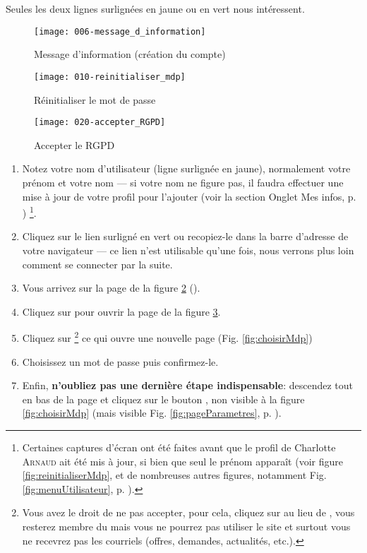 Seules les deux lignes surlignées en jaune ou en vert nous intéressent.
\begin{figure}
    \texttt{[image: 006-message\_d\_information]}
    \caption{Message d'information (création du compte)}
    \label{fig:messageInformation}
\end{figure}
\begin{figure}
    \texttt{[image: 010-reinitialiser\_mdp]}
    \caption{Réinitialiser le mot de passe}
    \label{fig:reinitialiserMdp}
\end{figure}
\begin{figure}
    \texttt{[image: 020-accepter\_RGPD]}
    \caption{Accepter le RGPD}
    \label{fig:accepterRgpd}
\end{figure}
\begin{enumerate}
    \item Notez votre nom d’utilisateur (ligne surlignée en jaune), normalement votre prénom et votre nom --- si votre nom ne figure pas, il faudra effectuer une mise à jour de votre profil pour l'ajouter (voir la section \og{}Onglet Mes infos\fg, p. \pageref{page:completerInfosPerso})%
    \footnote{\setcounter{noteProfilPasAJour}{\value{footnote}}\label{page:profilPasAJour}Certaines captures d'écran ont été faites avant que le profil de Charlotte \textsc{Arnaud} ait été mis à jour, si bien que seul le prénom apparaît (voir figure  \vref{fig:reinitialiserMdp}, et de nombreuses autres figures, notamment Fig. \ref{fig:menuUtilisateur}, p. \pageref{fig:menuUtilisateur}).}.
    \item Cliquez sur le lien surligné en vert ou recopiez-le dans la barre d’adresse de votre navigateur ---  ce lien n’est utilisable qu'une fois, nous verrons plus loin  comment se connecter par la suite.
    \item Vous arrivez sur la page de la figure \ref{fig:reinitialiserMdp} ().
    \item Cliquez sur  pour ouvrir la page de la figure \ref{fig:accepterRgpd}.
    \item Cliquez sur \label{page:accepteRgpd}%
    \footnote{Vous avez le droit de ne pas accepter, pour cela, cliquez sur  au lieu de , vous resterez membre du \sel mais vous ne pourrez pas utiliser le site et surtout vous ne recevrez pas les courriels (offres, demandes, actualités, etc.).}
    ce qui ouvre une nouvelle page (Fig. \vref{fig:choisirMdp})
    \item Choisissez un mot de passe puis confirmez-le.
    \item Enfin, \textbf{n’oubliez pas une dernière étape indispensable}: descendez tout en bas de la page et cliquez sur le bouton , non visible à la figure \ref{fig:choisirMdp} (mais visible Fig. \ref{fig:pageParametres}, p. \pageref{fig:pageParametres}).
\end{enumerate}


